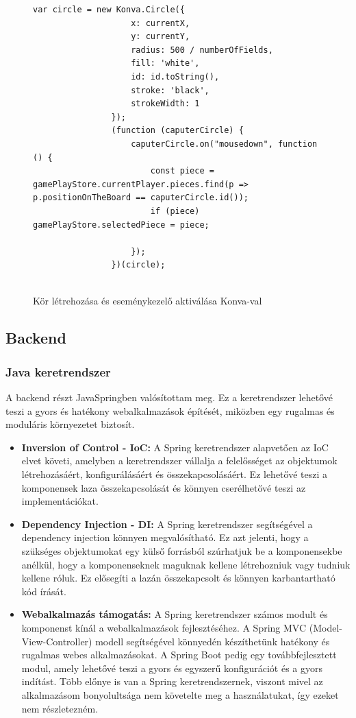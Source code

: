 \documentclass[a4paper,twoside]{article}
\begin{document}
\begin{figure}
	\caption{Kör létrehozása és eseménykezelő aktiválása Konva-val}
	
		\begin{minipage}{\textwidth}
			\begin{lstlisting}[style=javascriptStyle]
				var circle = new Konva.Circle({
					x: currentX,
					y: currentY,
					radius: 500 / numberOfFields,
					fill: 'white',
					id: id.toString(),
					stroke: 'black',
					strokeWidth: 1
				});
				(function (caputerCircle) {
					caputerCircle.on("mousedown", function () {
						const piece = gamePlayStore.currentPlayer.pieces.find(p => p.positionOnTheBoard == caputerCircle.id());
						if (piece) gamePlayStore.selectedPiece = piece;
						
					});
				})(circle);
				
			\end{lstlisting}
		\end{minipage}
	
	\label{konva}
\end{figure} 

\subsection{Backend}

\subsubsection{Java keretrendszer}
A backend részt JavaSpringben\cite{javaspring} valósítottam meg. Ez a keretrendszer lehetővé teszi a gyors és hatékony
webalkalmazások építését, miközben egy rugalmas és moduláris környezetet biztosít.
\begin{itemize}
	\item  \textbf{Inversion of Control - IoC:} A Spring keretrendszer alapvetően az IoC elvet követi,
	amelyben a keretrendszer vállalja a felelősséget az objektumok létrehozásáért,
	konfigurálásáért és összekapcsolásáért. Ez lehetővé teszi a komponensek laza
	összekapcsolását és könnyen cserélhetővé teszi az implementációkat.
	\item \textbf{Dependency Injection - DI:} A Spring keretrendszer segítségével a dependency
	injection könnyen megvalósítható. Ez azt jelenti, hogy a szükséges objektumokat egy
	külső forrásból szúrhatjuk be a komponensekbe anélkül, hogy a komponenseknek
	maguknak kellene létrehozniuk vagy tudniuk kellene róluk. Ez elősegíti a lazán
	összekapcsolt és könnyen karbantartható kód írását.
	\item \textbf{Webalkalmazás támogatás:} A Spring keretrendszer számos modult és komponenst
	kínál a webalkalmazások fejlesztéséhez. A Spring MVC (Model-View-Controller)
	modell segítségével könnyedén készíthetünk hatékony és rugalmas webes
	alkalmazásokat. A Spring Boot pedig egy továbbfejlesztett modul, amely lehetővé
	teszi a gyors és egyszerű konfigurációt és a gyors indítást. Több előnye is van a Spring
	keretrendszernek, viszont mivel az alkalmazásom bonyolultsága nem követelte meg a
	használatukat, így ezeket nem részletezném.
\end{itemize}
\end{document}
